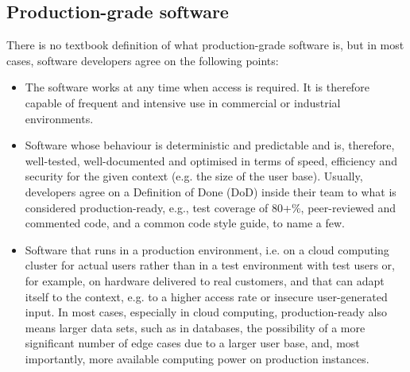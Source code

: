 \subsection{Production-grade software}
\label{chapter2-production-grade-software}

There is no textbook definition of what production-grade software is, but in most cases, software developers agree on the following points:

\begin{itemize}
  \item The software works at any time when access is required. It is therefore capable of frequent and intensive use in commercial or industrial environments.
  \item Software whose behaviour is deterministic and predictable and is, therefore, well-tested, well-documented and optimised in terms of speed, efficiency and security for the given context (e.g. the size of the user base). Usually, developers agree on a Definition of Done (DoD) inside their team to what is considered production-ready, e.g., test coverage of 80+\%, peer-reviewed and commented code, and a common code style guide, to name a few.
  \item Software that runs in a production environment, i.e. on a cloud computing cluster for actual users rather than in a test environment with test users or, for example, on hardware delivered to real customers, and that can adapt itself to the context, e.g. to a higher access rate or insecure user-generated input. In most cases, especially in cloud computing, production-ready also means larger data sets, such as in databases, the possibility of a more significant number of edge cases due to a larger user base, and, most importantly, more available computing power on production instances.
\end{itemize}

